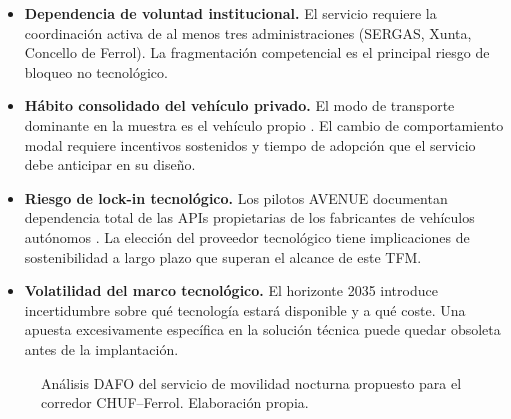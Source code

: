 \begin{itemize}

	\item \textbf{Dependencia de voluntad institucional.}
	El servicio requiere la coordinación activa de al menos
	tres administraciones (SERGAS, Xunta, Concello de Ferrol).
	La fragmentación competencial es el principal riesgo
	de bloqueo no tecnológico.

	\item \textbf{Hábito consolidado del vehículo privado.}
	El modo de transporte dominante en la muestra es el
	vehículo propio \parencite{LouridoRegueira2026}. El
	cambio de comportamiento modal requiere incentivos
	sostenidos y tiempo de adopción que el servicio debe
	anticipar en su diseño.

	\item \textbf{Riesgo de lock-in tecnológico.} Los
	pilotos AVENUE documentan dependencia total de las
	APIs propietarias de los fabricantes de vehículos
	autónomos \parencite{AVENUE2023}. La elección del
	proveedor tecnológico tiene implicaciones de
	sostenibilidad a largo plazo que superan el alcance
	de este TFM.

	\item \textbf{Volatilidad del marco tecnológico.}
	El horizonte 2035 introduce incertidumbre sobre qué
	tecnología estará disponible y a qué coste. Una
	apuesta excesivamente específica en la solución
	técnica puede quedar obsoleta antes de la implantación.

\end{itemize}

\begin{figure}[htbp]
	\centering
	\fbox{\rule{0pt}{7cm}\rule{0.95\textwidth}{0pt}}
	\caption{Análisis DAFO del servicio de movilidad nocturna
		propuesto para el corredor CHUF--Ferrol. Elaboración propia.}
	\label{fig:dafo}
\end{figure}
